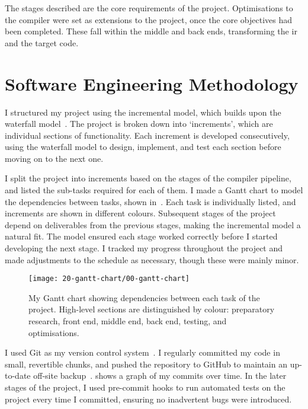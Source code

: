 \documentclass[00-main.tex]{subfiles}
\begin{document}
The stages described are the core requirements of the project.
Optimisations to the compiler were set as extensions to the project, once the core objectives had been completed.
These fall within the middle and back ends, transforming the \gls{ir} and the target code.



\section{Software Engineering Methodology}

I structured my project using the incremental model, which builds upon the waterfall model~.
The project is broken down into `increments', which are individual sections of functionality.
Each increment is developed consecutively, using the waterfall model to design, implement, and test each section before moving on to the next one.

I split the project into increments based on the stages of the compiler pipeline, and listed the sub-tasks required for each of them.
I made a Gantt chart to model the dependencies between tasks, shown in~.
Each task is individually listed, and increments are shown in different colours.
Subsequent stages of the project depend on deliverables from the previous stages, making the incremental model a natural fit.
The model ensured each stage worked correctly before I started developing the next stage.
I tracked my progress throughout the project and made adjustments to the schedule as necessary, though these were mainly minor.


\begin{figure}[b]
  \centering
  \texttt{[image: 20-gantt-chart/00-gantt-chart]}
  \caption{My Gantt chart showing dependencies between each task of the project. High-level sections are distinguished by colour: preparatory research, front end, middle end, back end, testing, and optimisations.}%
  \label{fig:gantt chart}
\end{figure}

I used Git as my version control system~.
I regularly committed my code in small, revertible chunks, and pushed the repository to GitHub to maintain an up-to-date off-site backup~.
 shows a graph of my commits over time.
In the later stages of the project, I used pre-commit hooks to run automated tests on the project every time I committed, ensuring no inadvertent bugs were introduced.
\end{document}
